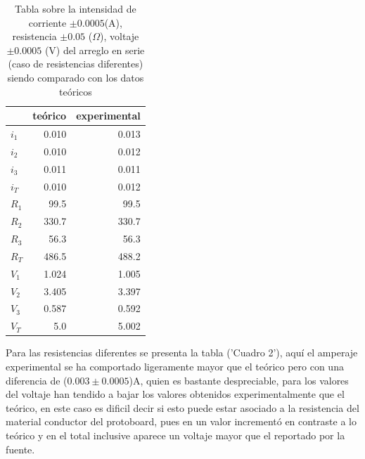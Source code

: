 \documentclass[article,12pt]{elsarticle}
\begin{document}
\begin{table}[h]
\centering
\begin{tabular}{|l|r|r|}
\hline
     & \multicolumn{1}{l|}{teórico} & \multicolumn{1}{l|}{experimental} \\ \hline
$i_1$ & 0.010                & 0.013                             \\ \hline
$i_2$ & 0.010                & 0.012                             \\ \hline
$i_3$ & 0.011                & 0.011                             \\ \hline
$i_T$ & 0.010                & 0.012                             \\ \hline
$R_1$ & 99.5                         & 99.5                              \\ \hline
$R_2$ & 330.7                        & 330.7                             \\ \hline
$R_3$ & 56.3                         & 56.3                              \\ \hline
$R_T$ & 486.5                        & 488.2                             \\ \hline
$V_1$ & 1.024                        & 1.005                             \\ \hline
$V_2$ & 3.405                        & 3.397                             \\ \hline
$V_3$ & 0.587                        & 0.592                             \\ \hline
$V_T$ & 5.0                         & 5.002                             \\ \hline
\end{tabular}
\caption{Tabla sobre la intensidad de corriente $\pm 0.0005$(A), resistencia $\pm 0.05$ ($\Omega$), voltaje $\pm 0.0005$ (V) del arreglo en serie (caso de resistencias diferentes) siendo comparado con los datos teóricos}
\end{table}

Para las resistencias diferentes se presenta la tabla ('Cuadro 2'), aquí el amperaje experimental se ha comportado ligeramente mayor que el teórico pero con una diferencia de ($0.003 \pm 0.0005$)A, quien es bastante despreciable, para los valores del voltaje han tendido a bajar los valores obtenidos experimentalmente que el teórico, en este caso es dificil decir si esto puede estar asociado a la resistencia del material conductor del protoboard, pues en un valor incrementó en contraste a lo teórico y en el total inclusive aparece un voltaje mayor que el reportado por la fuente.\\\\
\end{document}

